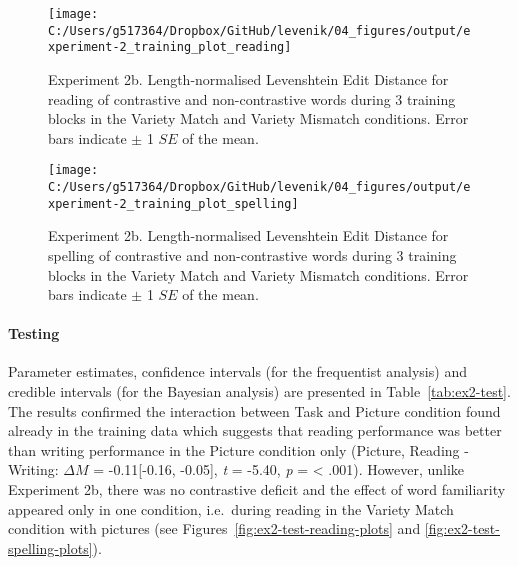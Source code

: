 \documentclass[doc,floatsintext]{apa6}
\let\oldparagraph\paragraph
\renewcommand{\paragraph}[1]{\oldparagraph{#1}\mbox{}}
\begin{document}
\newpage

\begin{figure}[H]

{\centering \texttt{[image: C:/Users/g517364/Dropbox/GitHub/levenik/04\_figures/output/experiment-2\_training\_plot\_reading]} 

}

\caption{Experiment 2b. Length-normalised Levenshtein Edit Distance for reading of contrastive and non-contrastive words during 3 training blocks in the Variety Match and Variety Mismatch conditions. Error bars indicate $\pm$ 1 $SE$ of the mean.}\label{fig:ex2-train-reading-plots}
\end{figure}

\newpage

\begin{figure}[H]

{\centering \texttt{[image: C:/Users/g517364/Dropbox/GitHub/levenik/04\_figures/output/experiment-2\_training\_plot\_spelling]} 

}

\caption{Experiment 2b. Length-normalised Levenshtein Edit Distance for spelling of contrastive and non-contrastive words during 3 training blocks in the Variety Match and Variety Mismatch conditions. Error bars indicate $\pm$ 1 $SE$ of the mean.}\label{fig:ex2-train-spelling-plots}
\end{figure}

\paragraph{Testing}\label{testing-2}

Parameter estimates, confidence intervals (for the frequentist analysis)
and credible intervals (for the Bayesian analysis) are presented in
Table~\ref{tab:ex2-test}. The results confirmed the interaction between
Task and Picture condition found already in the training data which
suggests that reading performance was better than writing performance in
the Picture condition only (Picture, Reading - Writing: \(\Delta{M}\) =
-0.11{[}-0.16, -0.05{]}, \emph{t} = -5.40, \emph{p} = \textless{} .001).
However, unlike Experiment 2b, there was no contrastive deficit and the
effect of word familiarity appeared only in one condition, i.e.~during
reading in the Variety Match condition with pictures (see
Figures~\ref{fig:ex2-test-reading-plots} and
\ref{fig:ex2-test-spelling-plots}).

\newpage
\end{document}
